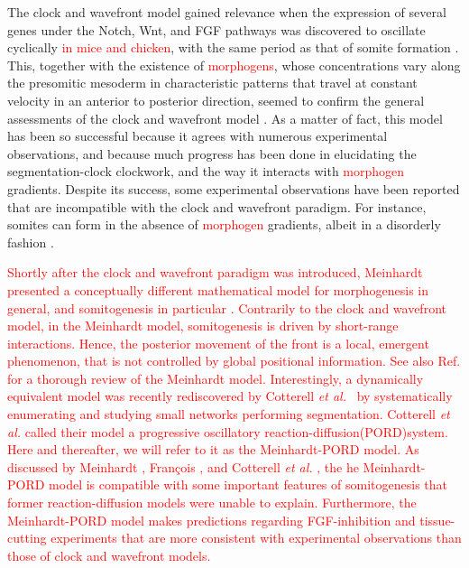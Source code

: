 \documentclass[%
 preprint,
 aip, 
 amsmath,amssymb,
]{revtex4-2}
\begin{document}
The clock and wavefront model gained relevance when the expression of several genes under the Notch, Wnt, and FGF pathways was discovered to oscillate cyclically \textcolor{red}{in mice and chicken}, with the same period as that of somite formation \cite{Palmeirim1997, Pourquie2001, Gibb2010, Pourquie2011}. This, together with the existence of \textcolor{red}{morphogens}, whose concentrations vary along the presomitic mesoderm in characteristic patterns that travel at constant velocity in an anterior to posterior direction, seemed to confirm the general assessments of the clock and wavefront model \cite{Gibb2010, Pourquie2011, Dubrulle2001}. As a matter of fact, this model has been so successful because it agrees with numerous experimental observations, and because much progress has been done in elucidating the segmentation-clock clockwork, and the way it interacts with \textcolor{red}{morphogen} gradients. Despite its success, some experimental observations have been reported that are incompatible with the clock and wavefront paradigm. For instance, somites can form in the absence of \textcolor{red}{morphogen} gradients, albeit in a disorderly fashion \cite{Naiche2011,Dias2014}.
	
\textcolor{red}{Shortly after the clock and wavefront paradigm was introduced, Meinhardt presented a conceptually different mathematical model for morphogenesis in general, and somitogenesis in particular \cite{Meinhardt1982}. Contrarily to the clock and wavefront model, in the Meinhardt model, somitogenesis is driven by short-range interactions. Hence, the posterior movement of the front is a local, emergent phenomenon, that is not controlled by global positional information. See also Ref. \cite{Francois2018} for a thorough review of the Meinhardt model. Interestingly, a dynamically equivalent model was recently rediscovered by Cotterell \emph{et al.}~\cite{Cotterell2015} by systematically enumerating and studying small networks performing segmentation. Cotterell \emph{et al.} called their model a progressive oscillatory reaction-diffusion(PORD)system. Here and thereafter, we will refer to it as the Meinhardt-PORD model. As discussed by Meinhardt \citep{Meinhardt1982}, Fran\c{c}ois \citep{Francois2018}, and Cotterell \emph{et al.} \cite{Cotterell2015}, the he Meinhardt-PORD model is compatible with some important features of somitogenesis that former reaction-diffusion models were unable to explain. Furthermore, the Meinhardt-PORD model makes predictions regarding FGF-inhibition and tissue-cutting experiments that are more consistent with experimental observations than those of clock and wavefront models.}
	
\end{document}
